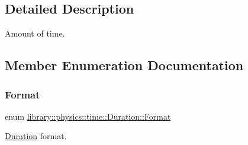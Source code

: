 \subsection{Detailed Description}
Amount of time. 

\subsection{Member Enumeration Documentation}
\mbox{\label{classlibrary_1_1physics_1_1time_1_1_duration_ace85659cafe97df992c0e4273bdc88d1}} 
\subsubsection{\texorpdfstring{Format}{Format}}
{\footnotesize\ttfamily enum \hyperlink{classlibrary_1_1physics_1_1time_1_1_duration_ace85659cafe97df992c0e4273bdc88d1}{library\+::physics\+::time\+::\+Duration\+::\+Format}\hspace{0.3cm}{\ttfamily [strong]}}



\hyperlink{classlibrary_1_1physics_1_1time_1_1_duration}{Duration} format. 

